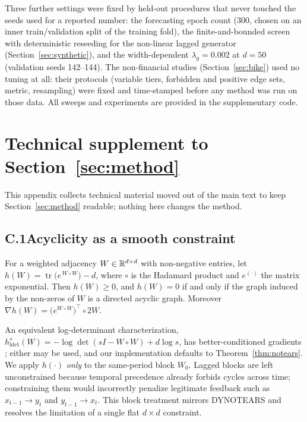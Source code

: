 \begingroup\sloppy
Three further settings were fixed by held-out procedures that never touched
the seeds used for a reported number: the forecasting epoch count (300, chosen on
an inner train/validation split of the training fold), the finite-and-bounded
screen with deterministic reseeding for the non-linear lagged generator
(Section~\ref{sec:synthetic}), and the width-dependent $\lambda_g{=}0.002$ at
$d{=}50$ (validation seeds 142--144). The non-financial studies
(Section~\ref{sec:bike}) used no tuning at all: their protocols (variable tiers,
forbidden and positive edge sets, metric, resampling) were fixed and time-stamped
before any method was run on those data. All sweeps and experiments are provided
in the supplementary code.
\endgroup

\section{Technical supplement to Section~\ref{sec:method}}
\label{app:techsupp}

This appendix collects technical material moved out of the main text to keep
Section~\ref{sec:method} readable; nothing here changes the method.

\subsection*{C.1\quad Acyclicity as a smooth constraint}

\begin{theorem}\label{thm:notears}
For a weighted adjacency $W\in\mathbb{R}^{d\times d}$ with non-negative entries, let
$h(W)=\operatorname{tr}\!\big(e^{\,W\circ W}\big)-d$, where $\circ$ is the
Hadamard product and $e^{(\cdot)}$ the matrix exponential. Then $h(W)\ge 0$, and
$h(W)=0$ if and only if the graph induced by the non-zeros of $W$ is a directed
acyclic graph. Moreover $\nabla h(W)=\big(e^{W\circ W}\big)^{\!\top}\!\circ 2W$.
\end{theorem}
An equivalent log-determinant characterization,
$h^{s}_{\mathrm{ldet}}(W)=-\log\det(sI-W\circ W)+d\log s$, has better-conditioned
gradients \citep{Bello2022}; either may be used, and our implementation defaults to
Theorem~\ref{thm:notears}. We apply $h(\cdot)$ \emph{only} to the same-period block
$W_0$. Lagged blocks are left unconstrained because temporal precedence already
forbids cycles across time; constraining them would incorrectly penalize
legitimate feedback such as $x_{t-1}\!\to\! y_t$ and $y_{t-1}\!\to\! x_t$. This
block treatment mirrors DYNOTEARS \citep{Pamfil2020} and resolves the limitation of
a single flat $d\times d$ constraint.

